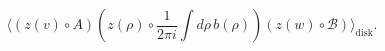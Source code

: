 \begin{equation}
  \langle (z(v) \circ A )(z(\rho) \circ \frac{1}{2 \pi i}\int d\rho\, b(\rho))
( z(w)\circ \mathcal{B}) \rangle_{\text{disk}}.
\end{equation}

